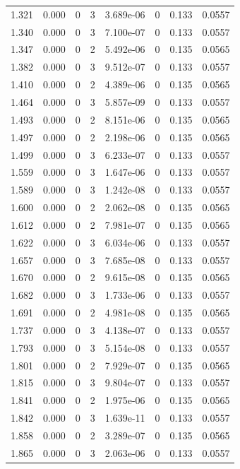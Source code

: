 \documentclass[preview]{standalone}
\begin{document}
{{{\begin{tabular}{L{1.2cm}C{1.2cm} C{0.3cm}C{0.5cm} C{1.4cm}C{1.4cm} C{1.4cm}C{1.4cm}}
  1.321  &  0.000  & 0     &  3 &  3.689e-06  & 0  & 0.133 &  0.0557   \\ 
  1.340  &  0.000  & 0     &  3 &  7.100e-07  & 0  & 0.133 &  0.0557   \\ 
  1.347  &  0.000  & 0     &  2 &  5.492e-06  & 0  & 0.135 &  0.0565   \\ 
  1.382  &  0.000  & 0     &  3 &  9.512e-07  & 0  & 0.133 &  0.0557   \\ 
  1.410  &  0.000  & 0     &  2 &  4.389e-06  & 0  & 0.135 &  0.0565   \\ 
  1.464  &  0.000  & 0     &  3 &  5.857e-09  & 0  & 0.133 &  0.0557   \\ 
  1.493  &  0.000  & 0     &  2 &  8.151e-06  & 0  & 0.135 &  0.0565   \\ 
  1.497  &  0.000  & 0     &  2 &  2.198e-06  & 0  & 0.135 &  0.0565   \\ 
  1.499  &  0.000  & 0     &  3 &  6.233e-07  & 0  & 0.133 &  0.0557   \\ 
  1.559  &  0.000  & 0     &  3 &  1.647e-06  & 0  & 0.133 &  0.0557   \\ 
  1.589  &  0.000  & 0     &  3 &  1.242e-08  & 0  & 0.133 &  0.0557   \\ 
  1.600  &  0.000  & 0     &  2 &  2.062e-08  & 0  & 0.135 &  0.0565   \\ 
  1.612  &  0.000  & 0     &  2 &  7.981e-07  & 0  & 0.135 &  0.0565   \\ 
  1.622  &  0.000  & 0     &  3 &  6.034e-06  & 0  & 0.133 &  0.0557   \\ 
  1.657  &  0.000  & 0     &  3 &  7.685e-08  & 0  & 0.133 &  0.0557   \\ 
  1.670  &  0.000  & 0     &  2 &  9.615e-08  & 0  & 0.135 &  0.0565   \\ 
  1.682  &  0.000  & 0     &  3 &  1.733e-06  & 0  & 0.133 &  0.0557   \\ 
  1.691  &  0.000  & 0     &  2 &  4.981e-08  & 0  & 0.135 &  0.0565   \\ 
  1.737  &  0.000  & 0     &  3 &  4.138e-07  & 0  & 0.133 &  0.0557   \\ 
  1.793  &  0.000  & 0     &  3 &  5.154e-08  & 0  & 0.133 &  0.0557   \\ 
  1.801  &  0.000  & 0     &  2 &  7.929e-07  & 0  & 0.135 &  0.0565   \\ 
  1.815  &  0.000  & 0     &  3 &  9.804e-07  & 0  & 0.133 &  0.0557   \\ 
  1.841  &  0.000  & 0     &  2 &  1.975e-06  & 0  & 0.135 &  0.0565   \\ 
  1.842  &  0.000  & 0     &  3 &  1.639e-11  & 0  & 0.133 &  0.0557   \\ 
  1.858  &  0.000  & 0     &  2 &  3.289e-07  & 0  & 0.135 &  0.0565   \\ 
  1.865  &  0.000  & 0     &  3 &  2.063e-06  & 0  & 0.133 &  0.0557   \\ 
\hline 
\end{tabular} 

}}}
\end{document}
